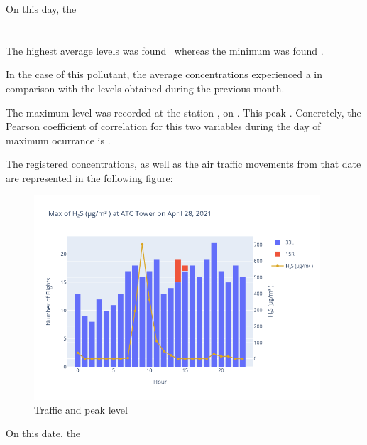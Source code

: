 \documentclass[12pt, oneside]{book}
\begin{document}
On this day, the \windPMten

\section{}



The highest average  levels was found \maxDailyHtwoS\ whereas the minimum was found \minDailyHtwoS .


In the case of this pollutant, the average concentrations experienced a \monthChangeHtwoS in comparison with the levels obtained during the previous month.


The  maximum level was recorded at the station \stationMaxHtwoS, on \dayMaxHtwoS . This peak \relTrafficMaxPMten .  Concretely, the Pearson coefficient of correlation for this two variables during the day of maximum ocurrance is \correlPMten .

The registered concentrations, as well as the air traffic movements from that date are represented in the following figure:

{\begin{figure}[H]
\centering
\includegraphics[width=0.95\textwidth, keepaspectratio]{image17}
\caption{Traffic and  peak level}\label{image17}
\end{figure}}{}

On this date, the \windHtwoS
\end{document}
